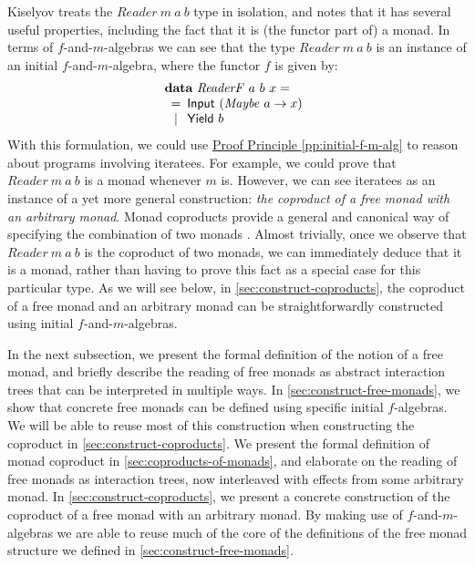 \documentclass{jfp1}
\newcommand{\proofprinref}[1]{\hyperref[#1]{Proof Principle \ref*{#1}}}
\newcommand{\kw}[1]{\textbf{#1}}
\begin{document}
Kiselyov treats the $\mathit{Reader}~m~a~b$ type in isolation, and
notes that it has several useful properties, including the fact that
it is (the functor part of) a monad. In terms of $f$-and-$m$-algebras
we can see that the type $\mathit{Reader}~m~a~b$ is an instance of an
initial $f$-and-$m$-algebra, where the functor $f$ is given by:
\begin{displaymath}
  \begin{array}{l}
    \kw{data}~\mathit{ReaderF}~a~b~x = \\
    \begin{array}[t]{c@{\hspace{0.5em}}l}
      = & \mathsf{Input}~(\mathit{Maybe}~a \to x) \\
      | & \mathsf{Yield}~b
    \end{array}
  \end{array}
\end{displaymath}
With this formulation, we could use \proofprinref{pp:initial-f-m-alg}
to reason about programs involving iteratees. For example, we could
prove that $\mathit{Reader}~m~a~b$ is a monad whenever $m$
is. However, we can see iteratees as an instance of a yet more general
construction: \emph{the coproduct of a free monad with an arbitrary
  monad}. Monad coproducts provide a general and canonical way of
specifying the combination of two monads
\cite{luth02composing}. Almost trivially, once we observe that
$\mathit{Reader}~m~a~b$ is the coproduct of two monads, we can
immediately deduce that it is a monad, rather than having to prove
this fact as a special case for this particular type. As we will see
below, in \autoref{sec:construct-coproducts}, the coproduct of a free
monad and an arbitrary monad can be straightforwardly constructed
using initial $f$-and-$m$-algebras.

In the next subsection, we present the formal definition of the notion
of a free monad, and briefly describe the reading of free monads as
abstract interaction trees that can be interpreted in multiple
ways. In \autoref{sec:construct-free-monads}, we show that concrete
free monads can be defined using specific initial $f$-algebras. We
will be able to reuse most of this construction when constructing the
coproduct in \autoref{sec:construct-coproducts}. We present the formal
definition of monad coproduct in \autoref{sec:coproducts-of-monads},
and elaborate on the reading of free monads as interaction trees, now
interleaved with effects from some arbitrary monad. In
\autoref{sec:construct-coproducts}, we present a concrete construction
of the coproduct of a free monad with an arbitrary monad. By making
use of $f$-and-$m$-algebras we are able to reuse much of the core of
the definitions of the free monad structure we defined in
\autoref{sec:construct-free-monads}. 
\end{document}

